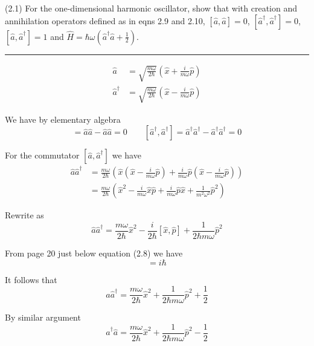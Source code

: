 \documentclass[12pt]{article}
\begin{document}
(2.1)
For the one-dimensional harmonic oscillator, show
that with creation and annihilation operators defined
as in eqns 2.9 and 2.10, $[\hat a,\hat a]=0$,
$[\hat a^\dag,\hat a^\dag]=0$,
$[\hat a,\hat a^\dag]=1$ and
$\hat H=\hbar\omega\left(\hat a^\dag\hat a+\tfrac{1}{2}\right)$.

\bigskip
\hrule

\bigskip
\begin{align*}
\hat a&=\sqrt{\frac{m\omega}{2\hbar}}
\left(\hat x+\frac{i}{m\omega}\hat p\right)
\tag{2.9}
\\
\hat a^\dag&=\sqrt{\frac{m\omega}{2\hbar}}
\left(\hat x-\frac{i}{m\omega}\hat p\right)
\tag{2.10}
\end{align*}

We have by elementary algebra
\begin{equation*}
[\hat a,\hat a]=\hat a\hat a-\hat a\hat a=0
\qquad
[\hat a^\dag,\hat a^\dag]=\hat a^\dag\hat a^\dag-\hat a^\dag\hat a^\dag=0
\end{equation*}

For the commutator $[\hat a,\hat a^\dag]$ we have
\begin{align*}
\hat a\hat a^\dag
&=\frac{m\omega}{2\hbar}
\left(
\hat x\left(\hat x-\frac{i}{m\omega}\hat p\right)
+\frac{i}{m\omega}\hat p\left(\hat x-\frac{i}{m\omega}\hat p\right)
\right)
\\
&=\frac{m\omega}{2\hbar}
\left(
\hat x^2-\frac{i}{m\omega}\hat x\hat p+\frac{i}{m\omega}\hat p\hat x+\frac{1}{m^2\omega^2}\hat p^2\right)
\end{align*}

Rewrite as
\begin{equation*}
\hat a\hat a^\dag
=\frac{m\omega}{2\hbar}\hat x^2-\frac{i}{2\hbar}[\hat x,\hat p]+\frac{1}{2\hbar m\omega}\hat p^2
\end{equation*}

From page 20 just below equation (2.8) we have
\begin{equation*}
[\hat x,\hat p]=i\hbar
\end{equation*}

It follows that
\begin{equation*}
\hat a\hat a^\dag
=\frac{m\omega}{2\hbar}\hat x^2+\frac{1}{2\hbar m\omega}\hat p^2+\frac{1}{2}
\tag{1}
\end{equation*}

By similar argument
\begin{equation*}
\hat a^\dag\hat a
=\frac{m\omega}{2\hbar}\hat x^2+\frac{1}{2\hbar m\omega}\hat p^2-\frac{1}{2}
\tag{2}
\end{equation*}
\end{document}
